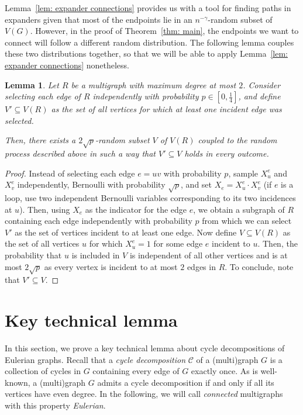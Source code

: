 \documentclass[11pt,reqno]{article}
\newtheorem{lemma}[theorem]{Lemma}
\begin{document}
Lemma~\ref{lem: expander connections} provides us with a tool for finding paths in expanders given that most of the endpoints lie in an $n^{-\gamma}$-random subset of $V(G)$. However, in the proof of Theorem~\ref{thm: main}, the endpoints we want to connect will follow a different random distribution. The following lemma couples these two distributions together, so that we will be able to apply Lemma~\ref{lem: expander connections} nonetheless.
\begin{lemma}\label{lem: coupling}
    Let $R$ be a multigraph with maximum degree at most $2$. Consider selecting each edge of $R$ independently with probability $p\in \left[0,\frac{1}{4}\right]$, and define $V'\subseteq V(R)$ as the set of all vertices for which at least one incident edge was selected. 

    Then, there exists a $2\sqrt{p}$-random subset $V$ of $V(R)$ coupled to the random process described above in such a way that $V'\subseteq V$ holds in every outcome.
\end{lemma}
\begin{proof}
    Instead of selecting each edge $e=uv$ with probability $p$, sample $X_u^e$ and $X_v^e$ independently, Bernoulli with probability $\sqrt p$, and set $X_e = X_u^e\cdot X_v^e$ (if $e$ is a loop, use two independent Bernoulli variables corresponding to its two incidences at $u$). Then, using $X_e$ as the indicator for the edge $e$, we obtain a subgraph of $R$ containing each edge independently with probability $p$ from which we can select $V'$ as the set of vertices incident to at least one edge. Now define $V\subseteq V(R)$ as the set of all vertices $u$ for which $X^e_u=1$ for some edge $e$ incident to $u$. Then, the probability that $u$ is included in $V$ is independent of all other vertices and is at most $2\sqrt{p}$ as every vertex is incident to at most $2$ edges in $R$. To conclude, note that $V'\subseteq V$.
\end{proof}
\section{Key technical lemma}\label{sec:keylemma}
In this section, we prove a key technical lemma about cycle decompositions of Eulerian graphs. Recall that a \emph{cycle decomposition} $\mathcal{C}$ of a (multi)graph $G$ is a collection of cycles in $G$ containing every edge of $G$ exactly once. As is well-known, a (multi)graph $G$ admits a cycle decomposition if and only if all its vertices have even degree. In the following, we will call \emph{connected} multigraphs with this property \emph{Eulerian}. 
\end{document}
